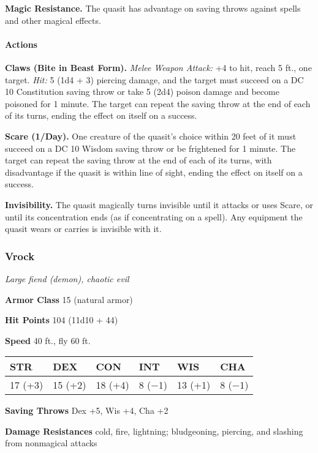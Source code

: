 \documentclass[
]{article}
\begin{document}
\textbf{Magic Resistance.} The quasit has advantage on saving throws
against spells and other magical effects.

\hypertarget{actions-7}{%
\paragraph{Actions}\label{actions-7}}

\textbf{Claws (Bite in Beast Form).} \emph{Melee Weapon Attack:} +4 to
hit, reach 5 ft., one target. \emph{Hit:} 5 (1d4 + 3) piercing damage,
and the target must succeed on a DC 10 Constitution saving throw or take
5 (2d4) poison damage and become poisoned for 1 minute. The target can
repeat the saving throw at the end of each of its turns, ending the
effect on itself on a success.

\textbf{Scare (1/Day).} One creature of the quasit's choice within 20
feet of it must succeed on a DC 10 Wisdom saving throw or be frightened
for 1 minute. The target can repeat the saving throw at the end of each
of its turns, with disadvantage if the quasit is within line of sight,
ending the effect on itself on a success.

\textbf{Invisibility.} The quasit magically turns invisible until it
attacks or uses Scare, or until its concentration ends (as if
concentrating on a spell). Any equipment the quasit wears or carries is
invisible with it.

\hypertarget{vrock}{%
\subsubsection{Vrock}\label{vrock}}

\emph{Large fiend (demon), chaotic evil}

\textbf{Armor Class} 15 (natural armor)

\textbf{Hit Points} 104 (11d10 + 44)

\textbf{Speed} 40 ft., fly 60 ft.

\begin{longtable}[]{@{}llllll@{}}
\toprule
STR & DEX & CON & INT & WIS & CHA\tabularnewline
\midrule
\endhead
17 (+3) & 15 (+2) & 18 (+4) & 8 (−1) & 13 (+1) & 8 (−1)\tabularnewline
\bottomrule
\end{longtable}

\textbf{Saving Throws} Dex +5, Wis +4, Cha +2

\textbf{Damage Resistances} cold, fire, lightning; bludgeoning,
piercing, and slashing from nonmagical attacks
\end{document}
